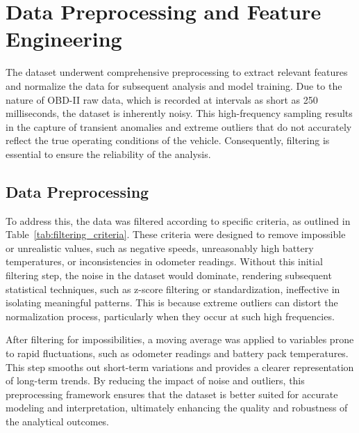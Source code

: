 \section{Data Preprocessing and Feature Engineering}

The dataset underwent comprehensive preprocessing to extract relevant features and normalize the data for subsequent analysis and model training. 
Due to the nature of \gls{OBD-II} raw data, which is recorded at intervals as short as 250 milliseconds, the dataset is inherently noisy. 
This high-frequency sampling results in the capture of transient anomalies and extreme outliers that do not accurately reflect the true operating conditions of the vehicle. 
Consequently, filtering is essential to ensure the reliability of the analysis.

\subsection{Data Preprocessing}

To address this, the data was filtered according to specific criteria, as outlined in Table~\ref{tab:filtering_criteria}. 
These criteria were designed to remove impossible or unrealistic values, such as negative speeds, unreasonably high battery temperatures, or inconsistencies in odometer readings. 
Without this initial filtering step, the noise in the dataset would dominate, rendering subsequent statistical techniques, such as z-score filtering or standardization, ineffective in isolating meaningful patterns. 
This is because extreme outliers can distort the normalization process, particularly when they occur at such high frequencies.

After filtering for impossibilities, a moving average was applied to variables prone to rapid fluctuations, such as odometer readings and battery pack temperatures. 
This step smooths out short-term variations and provides a clearer representation of long-term trends. 
By reducing the impact of noise and outliers, this preprocessing framework ensures that the dataset is better suited for accurate modeling and interpretation, ultimately enhancing the quality and robustness of the analytical outcomes.

